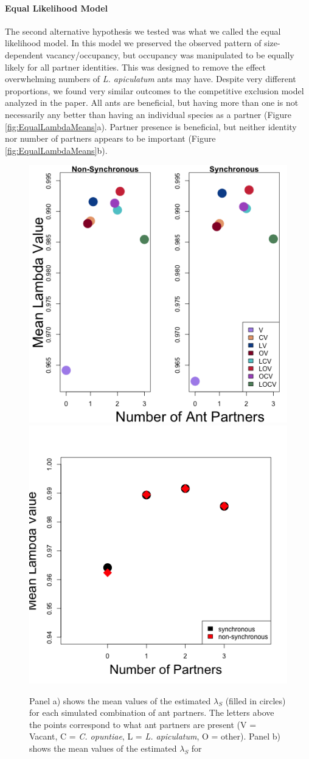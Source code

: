 \documentclass[11pt]{article}
\begin{document}
\paragraph{Equal Likelihood Model}
The second alternative hypothesis we tested was what we called the equal likelihood model.
In this model we preserved the observed pattern of size-dependent vacancy/occupancy, but occupancy was manipulated to be equally likely for all partner identities. 
This was designed to remove the effect overwhelming numbers of \textit{L. apiculatum} ants may have. 
Despite very different proportions, we found very similar outcomes to the competitive exclusion model analyzed in the paper. 
All ants are beneficial, but having more than one is not necessarily any better than having an individual species as a partner (Figure \ref{fig:EqualLambdaMeans}a).
Partner presence is beneficial, but neither identity nor number of partners appears to be important (Figure \ref{fig:EqualLambdaMeans}b).

\begin{figure}
\includegraphics[width=0.61\linewidth]{Figures/Lambdas_equal.png}
\includegraphics[width=0.39\linewidth]{Figures/equal_num_partners.png}
\caption{Panel a) shows the mean values of the estimated $\lambda_{S}$ (filled in circles) for each simulated combination of ant partners. The letters above the points correspond to what ant partners are present (V = Vacant, C = \textit{C. opuntiae}, L = \textit{L. apiculatum}, O = other). Panel b) shows the mean values of the estimated $\lambda_{S}$ for }
\label{app:EqualLambdaMeans}
\end{figure}
\end{document}
